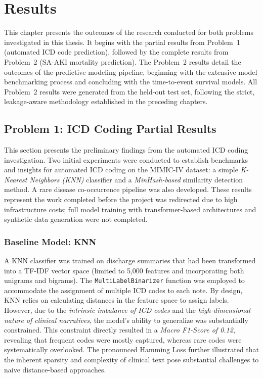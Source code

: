 \chapter{Results}\label{chap:results}
This chapter presents the outcomes of the research conducted for both problems investigated in this thesis. It begins with the partial results from Problem~1 (automated ICD code prediction), followed by the complete results from Problem~2 (SA-AKI mortality prediction). The Problem~2 results detail the outcomes of the predictive modeling pipeline, beginning with the extensive model benchmarking process and concluding with the time-to-event survival models. All Problem~2 results were generated from the held-out test set, following the strict, leakage-aware methodology established in the preceding chapters.

\section{Problem 1: ICD Coding Partial Results}\label{sec:p1:results}

This section presents the preliminary findings from the automated ICD coding investigation. Two initial experiments were conducted to establish benchmarks and insights for automated ICD coding on the MIMIC-IV dataset: a simple \emph{K-Nearest Neighbors (KNN)} classifier and a \emph{MinHash-based} similarity detection method. A rare disease co-occurrence pipeline was also developed. These results represent the work completed before the project was redirected due to high infrastructure costs; full model training with transformer-based architectures and synthetic data generation were not completed.

\subsection{Baseline Model: KNN}\label{sec:p1:knn_baseline}
A KNN classifier was trained on discharge summaries that had been transformed into a TF-IDF vector space (limited to 5{,}000 features and incorporating both unigrams and bigrams). The \texttt{MultiLabelBinarizer} function was employed to accommodate the assignment of multiple ICD codes to each note. By design, KNN relies on calculating distances in the feature space to assign labels. However, due to the \emph{intrinsic imbalance of ICD codes} and the \emph{high-dimensional nature of clinical narratives}, the model's ability to generalize was substantially constrained. This constraint directly resulted in a \emph{Macro F1-Score of 0.12}, revealing that frequent codes were mostly captured, whereas rare codes were systematically overlooked. The pronounced Hamming Loss further illustrated that the inherent sparsity and complexity of clinical text pose substantial challenges to naive distance-based approaches.

